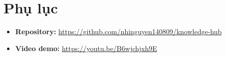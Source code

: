 \section*{Phụ lục}

\begin{itemize}
  \item \textbf{Repository:} \href{https://github.com/nhinguyen140809/knowledge-hub}{https://github.com/nhinguyen140809/knowledge-hub}
  \item \textbf{Video demo:} \href{https://youtu.be/B6wjchjxh9E}{https://youtu.be/B6wjchjxh9E}
\end{itemize}
